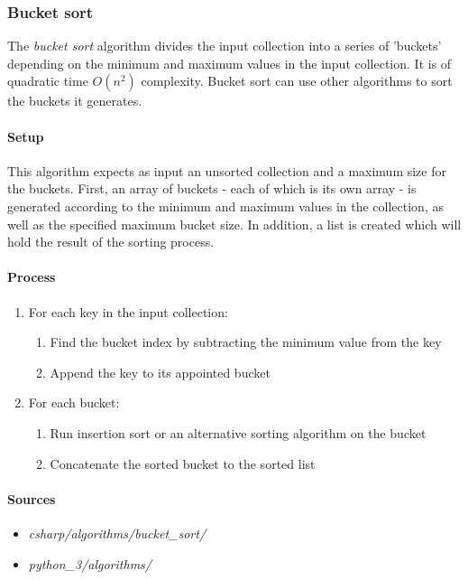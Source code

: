 \documentclass{article}
\begin{document}
\subsubsection{Bucket sort}
The {\em bucket sort} algorithm divides the input collection into a series of 'buckets' depending on the minimum and
maximum values in the input collection. It is of quadratic time \(O(n^2)\) complexity. Bucket sort can use other
algorithms to sort the buckets it generates.

\paragraph{Setup}
This algorithm expects as input an unsorted collection and a maximum size for the buckets. First, an array of
buckets - each of which is its own array - is generated according to the minimum and maximum values in the
collection, as well as the specified maximum bucket size. In addition, a list is created which will hold the
result of the sorting process.

\paragraph{Process}
\begin{enumerate}
\item{For each key in the input collection:}
  \begin{enumerate}
  \item{Find the bucket index by subtracting the minimum value from the key}
  \item{Append the key to its appointed bucket}
  \end{enumerate}
\item{For each bucket:}
  \begin{enumerate}
  \item{Run insertion sort or an alternative sorting algorithm on the bucket}
  \item{Concatenate the sorted bucket to the sorted list}
  \end{enumerate}
\end{enumerate}

\begin{samepage}
  \paragraph{Sources}
  \begin{itemize}
  \item{{\em csharp/algorithms/bucket\_sort/}}
  \item{{\em python\_3/algorithms/}}
  \end{itemize}
\end{samepage}
\end{document}
